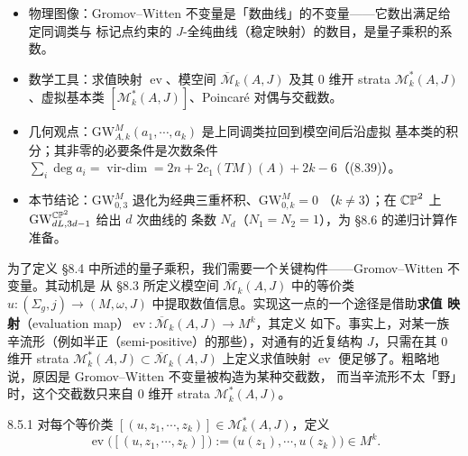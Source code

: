 \begin{keytakeaways}
\begin{itemize}
  \item 物理图像：Gromov--Witten 不变量是「数曲线」的不变量——它数出满足给定同调类与
        标记点约束的 $J$-全纯曲线（稳定映射）的数目，是量子乘积的系数。
  \item 数学工具：求值映射 $\operatorname{ev}$、模空间 $\overline{\mathcal{M}}_k(A,J)$
        及其 0 维开 strata $\mathcal{M}^*_k(A,J)$、虚拟基本类
        $[\mathcal{M}^*_k(A,J)]$、Poincaré 对偶与交截数。
  \item 几何观点：$\mathrm{GW}^M_{A,k}(a_1,\cdots,a_k)$ 是上同调类拉回到模空间后沿虚拟
        基本类的积分；其非零的必要条件是次数条件
        $\sum_i\deg a_i=\operatorname{vir-dim}=2n+2c_1(TM)(A)+2k-6$（(8.39)）。
  \item 本节结论：$\mathrm{GW}^M_{0,3}$ 退化为经典三重杯积、$\mathrm{GW}^M_{0,k}=0$
        （$k\ne3$）；在 $\mathbb{CP}^2$ 上 $\mathrm{GW}^{\mathbb{CP}^2}_{dL,3d-1}$ 给出 $d$ 次曲线的
        条数 $N_d$（$N_1=N_2=1$），为 §8.6 的递归计算作准备。
\end{itemize}
\end{keytakeaways}

为了定义 §8.4 中所述的量子乘积，我们需要一个关键构件——Gromov--Witten 不变量。其动机是
从 §8.3 所定义模空间 $\overline{\mathcal{M}}_k(A,J)$ 中的等价类
$u:(\Sigma_g,j)\to(M,\omega,J)$ 中提取数值信息。实现这一点的一个途径是借助\textbf{求值
映射}（evaluation map）$\operatorname{ev}:\overline{\mathcal{M}}_k(A,J)\to M^k$，其定义
如下。事实上，对某一族辛流形（例如半正（semi-positive）的那些），对通有的近复结构
$J$，只需在其 0 维开 strata
$\mathcal{M}^*_k(A,J)\subset\overline{\mathcal{M}}_k(A,J)$ 上定义求值映射
$\operatorname{ev}$ 便足够了。粗略地说，原因是 Gromov--Witten 不变量被构造为某种交截数，
而当辛流形不太「野」时，这个交截数只来自 0 维开 strata
$\mathcal{M}^*_k(A,J)$。

\begin{wdefn}{8.5.1}
对每个等价类 $[(u,z_1,\cdots,z_k)]\in\mathcal{M}^*_k(A,J)$，定义
\begin{equation}
  \operatorname{ev}\big([(u,z_1,\cdots,z_k)]\big)
  :=\big(u(z_1),\cdots,u(z_k)\big)\in M^k .
  \tag{8.36}
\end{equation}
\end{wdefn}

